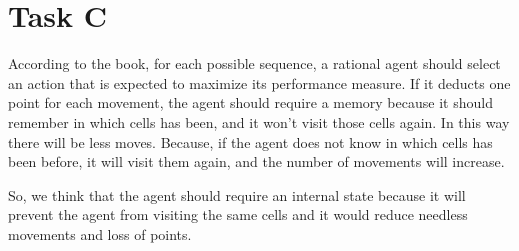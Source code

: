 
\section{Task C}
According to the book, for each possible sequence, a rational agent should
select an action that is expected to maximize its performance measure. If it
deducts one point for each movement, the agent should require a memory because
it should remember in which cells has been, and it won't visit those cells
again. In this way there will be less moves. Because, if the agent does not know
in which cells has been before, it will visit them again, and the number of
movements will increase.

So, we think that the agent should require an internal state because it will
prevent the agent from visiting the same cells and it would reduce needless
movements and loss of points.




